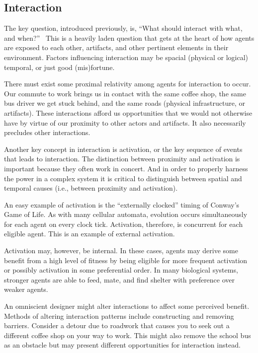 \documentclass[jou,apacite]{apa6}
\begin{document}
\subsection{Interaction}
The key question, introduced previously, is, ``What should interact with what, and when?''~\cite[page 62]{Axelrod}  This is a heavily laden question that gets at the heart of how agents are exposed to each other, artifacts, and other pertinent elements in their environment.  Factors influencing interaction may be spacial (physical or logical) temporal, or just good (mis)fortune.

There must exist some proximal relativity among agents for interaction to occur.  Our commute to work brings us in contact with the same coffee shop, the same bus driver we get stuck behind, and the same roads (physical infrastructure, or artifacts).  These interactions afford us opportunities that we would not otherwise have by virtue of our proximity to other actors and artifacts.  It also necessarily precludes other interactions.

Another key concept in interaction is activation, or the key sequence of events that leads to interaction.  The distinction between proximity and activation is important because they often work in concert.  And in order to properly harness the power in a complex system it is critical to distinguish between spatial and temporal causes (i.e., between proximity and activation).

An easy example of activation is the ``externally clocked'' timing of Conway's Game of Life.  As with many cellular automata, evolution occurs simultaneously for each agent on every clock tick.  Activation, therefore, is concurrent for each eligible agent.  This is an example of external activation.  

Activation may, however, be internal.  In these cases, agents may derive some benefit from a high level of fitness by being eligible for more frequent activation or possibly activation in some preferential order.  In many biological systems, stronger agents are able to feed, mate, and find shelter with preference over weaker agents.

An omniscient designer might alter interactions to affect some perceived benefit.  Methods of altering interaction patterns include constructing and removing barriers.  Consider a detour due to roadwork that causes you to seek out a different coffee shop on your way to work.  This might also remove the school bus as an obstacle but may present different opportunities for interaction instead.
\end{document}

